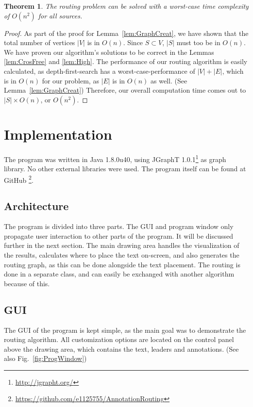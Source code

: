 \documentclass[11pt,a4paper]{vutinfth}
\newtheorem{theorem}{Theorem}
\begin{document}
\begin{theorem}
	The routing problem can be solved with a worst-case time complexity of $O(n^2)$ for all sources.
\end{theorem}
\begin{proof}
	As part of the proof for Lemma~\ref*{lem:GraphCreat}, we have shown that the total number of vertices $|V|$ is in $O(n)$. Since $S \subset V$, $|S|$ must too be in $O(n)$. 
	We have proven our algorithm's solutions to be correct in the Lemmas \ref*{lem:CrosFree} and \ref*{lem:High}.
	The performance of our routing algorithm is easily calculated, as depth-first-search has a worst-case-performance of $|V|+|E|$, which is in $O(n)$ for our problem, as $|E|$ is in $O(n)$ as well. (See Lemma~\ref*{lem:GraphCreat})
	Therefore, our overall computation time comes out to $|S| \times O(n)$, or $O(n^2)$.
\end{proof}


\chapter{Implementation}
The program was written in Java 1.8.0u40, using JGraphT 1.0.1\footnote{\url{http://jgrapht.org/}} as graph library. No other external libraries were used.
The program itself can be found at GitHub \footnote{\url{https://github.com/e1125755/AnnotationRouting}}.

\section{Architecture}
The program is divided into three parts. The GUI and program window only propagate user interaction to other parts of the program. It will be discussed further in the next section.
The main drawing area handles the visualization of the results, calculates where to place the text on-screen, and also generates the routing graph, as this can be done alongside the text placement.
The routing is done in a separate class, and can easily be exchanged with another algorithm because of this.

\section{GUI}
\label{sec:GUI}
The GUI of the program is kept simple, as the main goal was to demonstrate the routing algorithm. All customization options are located on the control panel above the drawing area, which contains the text, leaders and annotations. (See also Fig.~\ref*{fig:ProgWindow})
\end{document}
